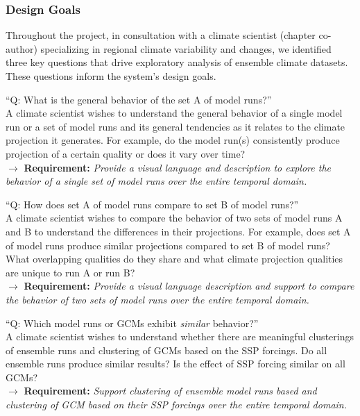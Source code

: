 \subsubsection{Design Goals}\label{ssec:design_requirements}
Throughout the project, in consultation with a climate scientist (chapter co-author) specializing in regional climate variability and changes, we identified three key questions that drive exploratory analysis of ensemble climate datasets. These questions inform the system's design goals.
\begin{tightItemize}
    \item[\req{R1}] {\normalfont \sffamily``Q: What is the general behavior of the set A of model runs?''}  \\ A climate scientist wishes to understand the general behavior of a single model run or a set of model runs and its general tendencies as it relates to the climate projection it generates. For example, do the model run(s) consistently produce projection of a certain quality or does it vary over time? \\ $\rightarrow$ \textbf{Requirement: }\textit{Provide a visual language and description to explore the behavior of a single set of model runs over the entire temporal domain.}
    \item[\req{R2}] {\normalfont \sffamily``Q: How does set A of model runs compare to set B of model runs?''} \\ A climate scientist wishes to compare the behavior of two sets of model runs A and B to understand the differences in their projections. For example, does set A of model runs produce similar projections compared to set B of model runs? What overlapping qualities do they share and what climate projection qualities are unique to run A or run B?\\ $\rightarrow$ 
    \textbf{Requirement: }\textit{Provide a visual language description and support to compare the behavior of two sets of model runs over the entire temporal domain.}
    \item[\req{R3}]{\normalfont \sffamily``Q: Which model runs or GCMs exhibit \textit{similar} behavior?''} \\ A climate scientist wishes to understand whether there are meaningful clusterings of ensemble runs and clustering of GCMs based on the SSP forcings. Do all ensemble runs produce similar results? Is the effect of SSP forcing similar on all GCMs?\\ $\rightarrow$ 
    \textbf{Requirement: }\textit{Support clustering of ensemble model runs based and clustering of GCM based on their SSP forcings over the entire temporal domain.} 
\end{tightItemize}

